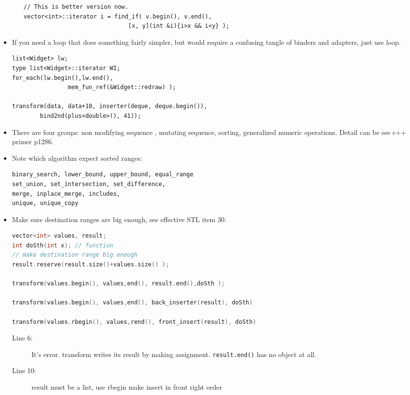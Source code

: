 \documentclass[a4paper,11pt,twoside]{book}
\begin{document}
\begin{itemize}
\begin{enumerate}
\begin{lstlisting}[numbers=none]
// This is better version now.
vector<int>::iterator i = find_if( v.begin(), v.end(),
                              [x, y](int &i){i>x && i<y} );
\end{lstlisting}

\end{enumerate}
	\item If you need a loop that does something fairly simpler, but would require a confusing tangle of binders and adapters, just use loop.
\begin{lstlisting}[numbers=none]
list<Widget> lw;
type list<Widget>::iterator WI;
for_each(lw.begin(),lw.end(),
                mem_fun_ref(&Widget::redraw) );

transform(data, data+10, inserter(deque, deque.begin()),
        bind2nd(plus<double>(), 41));
\end{lstlisting}

	\item There are four groups: non modifying sequence , mutating sequence, sorting, generalized numeric operations. Detail can be see c++ primer p1286.

	\item Note which algorithm expect sorted ranges:
\begin{lstlisting}[numbers=none]
binary_search, lower_bound, upper_bound, equal_range
set_union, set_intersection, set_difference,
merge, inplace_merge, includes,
unique, unique_copy
\end{lstlisting}



	\item Make sure destination ranges are big enough, see effective STL item 30.
\begin{lstlisting}[frame=single, language=c++]
vector<int> values, result;
int doSth(int x); // function
// make destination range big enough
result.reserve(result.size()+values.size() );

transform(values.begin(), values,end(), result.end(),doSth );

transform(values.begin(), values,end(), back_inserter(result), doSth)  

transform(values.rbegin(), values,rend(), front_insert(result), doSth)
\end{lstlisting}
\begin{description}
	\item[Line 6:] It's error. transform writes its result by making assignment. \texttt{result.end()} has no object at all.
	\item[Line 10:]  result must be a list, use rbegin make insert in front right order
\end{description}


\end{itemize}
\end{document}
